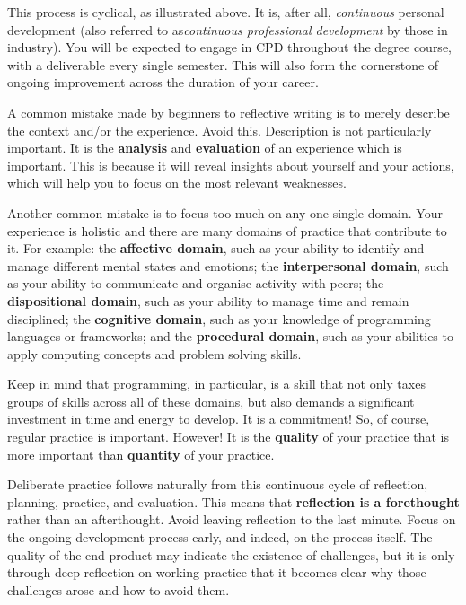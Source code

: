 \documentclass{../fal_assignment}
\begin{document}
This process is cyclical, as illustrated above. It is, after all, \textit{continuous} personal development (also referred to as\textit{continuous professional development} by those in industry). You will be expected to engage in CPD throughout the degree course, with a deliverable every single semester. This will also form the cornerstone of ongoing improvement across the duration of your career.

A common mistake made by beginners to reflective writing is to merely describe the context and/or the experience. Avoid this. Description is not particularly important. It is the \textbf{analysis} and \textbf{evaluation} of an experience which is important. This is because it will reveal insights about yourself and your actions, which will help you to focus on the most relevant weaknesses.

Another common mistake is to focus too much on any one single domain. Your experience is holistic and there are many domains of practice that contribute to it. For example: the \textbf{affective domain}, such as your ability to identify and manage different mental states and emotions; the \textbf{interpersonal domain}, such as your ability to communicate and organise activity with peers; the \textbf{dispositional domain}, such as your ability to manage time and remain disciplined; the \textbf{cognitive domain}, such as your knowledge of programming languages or frameworks; and the \textbf{procedural domain}, such as your abilities to apply computing concepts and problem solving skills. 

Keep in mind that programming, in particular, is a skill that not only taxes groups of skills across all of these domains, but also demands a significant investment in time and energy to develop. It is a commitment! So, of course, regular practice is important. However! It is the \textbf{quality} of your practice that is more important than \textbf{quantity} of your practice.

Deliberate practice follows naturally from this continuous cycle of reflection, planning, practice, and evaluation. This means that \textbf{reflection is a forethought} rather than an afterthought. Avoid leaving reflection to the last minute. Focus on the ongoing development process early, and indeed, on the process itself. The quality of the end product may indicate the existence of challenges, but it is only through deep reflection on working practice that it becomes clear why those challenges arose and how to avoid them.
\end{document}
